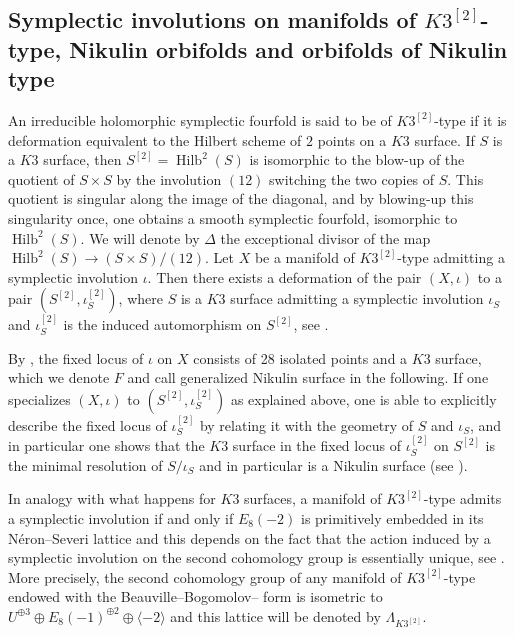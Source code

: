 \documentclass{amsart}
\theoremstyle{definition}
\numberwithin{equation}{section}
\numberwithin{equation}{section} \theoremstyle{definition}
\DeclareMathOperator{\Hilb}{Hilb}
\begin{document}
\subsection{Symplectic involutions on  manifolds of $K3^{[2]}$-type, Nikulin orbifolds and orbifolds of Nikulin type}\label{subsec: preliminarie on K32-type and Nikulin orbifold}
An irreducible holomorphic symplectic fourfold is said to be of $K3^{[2]}$-type if it is deformation equivalent to the Hilbert scheme of $2$ points on a $K3$ surface. If $S$ is a $K3$ surface, then $S^{[2]}= \Hilb^2(S)$ is isomorphic to the blow-up of the quotient of $S\times S$ by the involution $(12)$ switching the two copies of $S$. This quotient is singular along the image of the diagonal, and by blowing-up this singularity once, one obtains a smooth symplectic fourfold, isomorphic to $\Hilb^2(S)$. We will denote by $\Delta$ the exceptional divisor of the map $\Hilb^2(S)\to (S\times S)/(12)$.
Let $X$ be a  manifold of $K3^{[2]}$-type admitting a symplectic involution $\iota$. Then there exists a deformation of the pair $(X,\iota)$ to a pair $(S^{[2]},\iota_S^{[2]})$, where $S$ is a $K3$ surface admitting a symplectic involution $\iota_S$ and $\iota_S^{[2]}$ is the induced automorphism on $S^{[2]}$, see \cite{Mon}.

By \cite{Mon}, the fixed locus of $\iota$ on $X$ consists of 28 isolated points and a $K3$ surface, which we denote $F$ and call generalized Nikulin surface in the following. 
If one specializes $(X,\iota)$ to $(S^{[2]},\iota_S^{[2]})$ as explained above, one is able to explicitly describe the fixed locus of $\iota_{S}^{[2]}$ by relating it with the geometry of $S$ and $\iota_S$, and in particular one shows that the $K3$ surface in the fixed locus of $\iota_S^{[2]}$ on $S^{[2]}$ is the minimal resolution of $S/\iota_S$ and in particular is a Nikulin surface (see \cite{Mon}).

In analogy with what happens for $K3$ surfaces, a  manifold of $K3^{[2]}$-type admits a symplectic involution if and only if $E_8(-2)$ is primitively embedded in its N\'eron--Severi lattice and this depends on the fact that the action induced by a symplectic involution on the second cohomology group is essentially unique, see \cite{Mon}. More precisely, the second cohomology group of any manifold of $K3^{[2]}$-type endowed with the Beauville--Bogomolov-- form is isometric to $U^{\oplus 3}\oplus E_8(-1)^{\oplus 2}\oplus \langle -2\rangle$ and this lattice will be denoted by $\Lambda_{K3^{[2]}}$.
\end{document}
